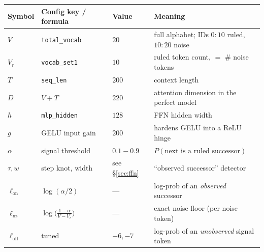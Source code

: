 \documentclass[11pt]{article}
\begin{document}
\begin{center}\small
\begin{tabular}{@{}llll@{}}
\toprule
Symbol & Config key / formula & Value & Meaning\\
\midrule
$V$        & \texttt{total\_vocab} & $20$  & full alphabet; IDs $0{:}10$ ruled, $10{:}20$ noise\\
$V_r$      & \texttt{vocab\_set1}  & $10$  & ruled token count, $=$ \# noise tokens\\
$T$        & \texttt{seq\_len}     & $200$ & context length\\
$D$        & $V+T$                 & $220$ & attention dimension in the perfect model\\
$h$        & \texttt{mlp\_hidden}  & $128$ & FFN hidden width\\
$g$        & GELU input gain       & $200$ & hardens GELU into a ReLU hinge\\
$\alpha$   & signal threshold      & $0.1{-}0.9$ & $P(\text{next is a ruled successor})$\\
$\tau,w$   & step knot, width      & see \S\ref{sec:ffn} & ``observed successor'' detector\\
$\ell_{\mathrm{on}}$ & $\log(\alpha/2)$ & --- & log-prob of an \emph{observed} successor\\
$\ell_{\mathrm{nz}}$ & $\log\!\big(\tfrac{1-\alpha}{V-V_r}\big)$ & --- & exact noise floor (per noise token)\\
$\ell_{\mathrm{off}}$ & tuned             & $-6,-7$ & log-prob of an \emph{unobserved} signal token\\
\bottomrule
\end{tabular}
\end{center}
\end{document}
